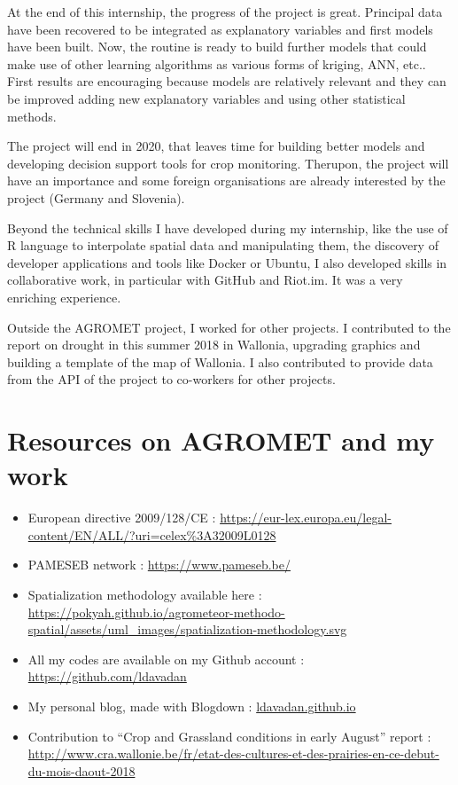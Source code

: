 \documentclass[12pt,twoside]{reedthesis}
\theoremstyle{definition}
\theoremstyle{definition}
\theoremstyle{definition}
\theoremstyle{remark}
\begin{document}
At the end of this internship, the progress of the project is great.
Principal data have been recovered to be integrated as explanatory
variables and first models have been built. Now, the routine is ready to
build further models that could make use of other learning algorithms as
various forms of kriging, ANN, etc.. First results are encouraging
because models are relatively relevant and they can be improved adding
new explanatory variables and using other statistical methods.

The project will end in 2020, that leaves time for building better
models and developing decision support tools for crop monitoring.
Therupon, the project will have an importance and some foreign
organisations are already interested by the project (Germany and
Slovenia).

Beyond the technical skills I have developed during my internship, like
the use of R language to interpolate spatial data and manipulating them,
the discovery of developer applications and tools like Docker or Ubuntu,
I also developed skills in collaborative work, in particular with GitHub
and Riot.im. It was a very enriching experience.

Outside the AGROMET project, I worked for other projects. I contributed
to the report on drought in this summer 2018 in Wallonia, upgrading
graphics and building a template of the map of Wallonia. I also
contributed to provide data from the API of the project to co-workers
for other projects.

\appendix

\chapter{Resources on AGROMET and my
work}\label{resources-on-agromet-and-my-work}
\begin{itemize}
\item
  European directive 2009/128/CE :
  \url{https://eur-lex.europa.eu/legal-content/EN/ALL/?uri=celex\%3A32009L0128}
\item
  PAMESEB network : \url{https://www.pameseb.be/}
\item
  Spatialization methodology available here :
  \url{https://pokyah.github.io/agrometeor-methodo-spatial/assets/uml_images/spatialization-methodology.svg}
\item
  All my codes are available on my Github account :
  \url{https://github.com/ldavadan}
\item
  My personal blog, made with Blogdown : \url{ldavadan.github.io}
\item
  Contribution to ``Crop and Grassland conditions in early August''
  report :
  \url{http://www.cra.wallonie.be/fr/etat-des-cultures-et-des-prairies-en-ce-debut-du-mois-daout-2018}
\end{itemize}
\end{document}
